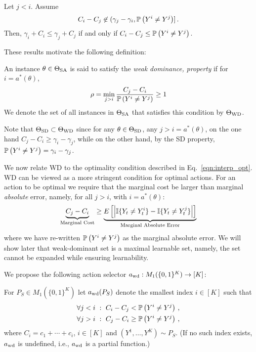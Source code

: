 \begin{prop}
\label{prop:jlei}
Let $j<i$. Assume
\begin{align}
\label{eq:cond2}
C_i - C_j \not\in (\gamma_j - \gamma_i, \mathbb{P}\left(Y^i \ne Y^j\right) ]\,.
\end{align}
Then, $\gamma_i + C_i \le \gamma_j + C_j$ if and only if $C_i - C_j \le \mathbb{P}\left(Y^i \ne Y^j\right)$.
\end{prop}

These results motivate the following definition:
\begin{defi}
	An instance $\theta \in \Theta_{\mathrm{SA}}$  is said to satisfy the \emph{weak dominance,  property} if 
	for $i = a^*(\theta)$,
	\begin{align}
	\label{eq:wd} \rho = \min_{j > i} \frac{C_j - C_i}{\Prob{Y^i\ne Y^j}} \ge 1 %
	\end{align}
We denote the set of all instances in $\Theta_{\mathrm{SA}}$ that satisfies this condition by $\Theta_{\mathrm{WD}}$.	
\end{defi}
Note that $\Theta_{\mathrm{SD}}\subset \Theta_{\mathrm{WD}}$ since for any $\theta\in \Theta_{\mathrm{SD}}$, any $j>i = a^*(\theta)$, on the one hand $C_j - C_i \ge \gamma_i - \gamma_j$, while on the other hand, by the SD property, $\mathbb{P}\left(Y^i\ne Y^j\right) = \gamma_i - \gamma_j$.

We now relate WD to the optimality condition described in Eq.~\eqref{eqn:interp_opt}. WD can be viewed as a more stringent condition for optimal actions. For an action to be optimal we require that the marginal cost be larger than marginal \emph{absolute} error, namely, for all $j > i$, with $i = a^*(\theta)$:
\begin{equation} \label{eqn:interp_WD}
\underbrace{C_j - C_i}_{\text{Marginal Cost}} \geq \underbrace{ E \left [ \left | \mathbb{I}\{Y_t \ne Y_t^i\} - \mathbb{I}\{Y_t \ne Y_t^j\} \right | \right ]}_{\text{Marginal Absolute Error}}
\end{equation}
where we have re-written $\mathbb{P}\left(Y^i\ne Y^j\right)$ as the marginal absolute error. We will show later that weak-dominant set is a maximal learnable set, namely, the set cannot be expanded while ensuring learnability.


We propose the following action selector $a_{\mathrm{wd}}: M_1(\{0,1\}^K)  \to [K]$:
\begin{defi}\label{def:awd}
For $P_S \in M_1(\{0,1\}^K) $ let $a_{\mathrm{wd}}(P_S)$ denote the smallest index $i\in [K]$ such that
\begin{subequations}
\begin{align}
\forall j<i \,\,:\,\, C_i - C_j < \mathbb{P}\left( Y^i \ne Y^j \right)\,, \label{eq:wd1}\\ 
\forall j>i \,\,:\,\, C_j - C_i \ge \mathbb{P}\left( Y^i \ne Y^j \right)\,, \label{eq:wd2}
\end{align}
\end{subequations}
where $C_i = c_1+\cdots + c_i$, $i\in [K]$ and $(Y^1,\dots,Y^K) \sim P_S$.
(If no such index exists, $a_{\mathrm{wd}}$ is undefined, i.e., $a_{\mathrm{wd}}$ is a partial function.)
\end{defi}

